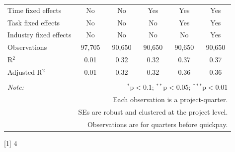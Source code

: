 \documentclass[
]{article}
\begin{document}
\begin{table}[H]
\begin{tabular}{@{\extracolsep{-2pt}}lccccc}
Time fixed effects & No & No & Yes & Yes & Yes \\ 
Task fixed effects & No & No & No & Yes & Yes \\ 
Industry fixed effects & No & No & No & No & Yes \\ 
Observations & 97,705 & 90,650 & 90,650 & 90,650 & 90,650 \\ 
R$^{2}$ & 0.01 & 0.32 & 0.32 & 0.37 & 0.37 \\ 
Adjusted R$^{2}$ & 0.01 & 0.32 & 0.32 & 0.36 & 0.36 \\ 
\hline 
\hline \\[-1.8ex] 
\textit{Note:}  & \multicolumn{5}{r}{$^{*}$p$<$0.1; $^{**}$p$<$0.05; $^{***}$p$<$0.01} \\ 
 & \multicolumn{5}{r}{Each observation is a project-quarter.} \\ 
 & \multicolumn{5}{r}{SEs are robust and clustered at the project level.} \\ 
 & \multicolumn{5}{r}{Observations are for quarters before quickpay.} \\ 
\end{tabular} 
\end{table}

{[}1{]} 4
\end{document}
